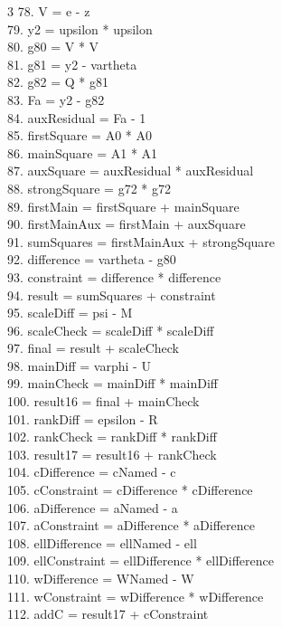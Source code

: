 \documentclass[10pt]{article}
\begin{document}
\begin{multicols}{3}
78. V = e - z\\
79. y2 = upsilon * upsilon\\
80. g80 = V * V\\
81. g81 = y2 - vartheta\\
82. g82 = Q * g81\\
83. Fa = y2 - g82\\
84. auxResidual = Fa - 1\\
85. firstSquare = A0 * A0\\
86. mainSquare = A1 * A1\\
87. auxSquare = auxResidual * auxResidual\\
88. strongSquare = g72 * g72\\
89. firstMain = firstSquare + mainSquare\\
90. firstMainAux = firstMain + auxSquare\\
91. sumSquares = firstMainAux + strongSquare\\
92. difference = vartheta - g80\\
93. constraint = difference * difference\\
94. result = sumSquares + constraint\\
95. scaleDiff = psi - M\\
96. scaleCheck = scaleDiff * scaleDiff\\
97. final = result + scaleCheck\\
98. mainDiff = varphi - U\\
99. mainCheck = mainDiff * mainDiff\\
100. result16 = final + mainCheck\\
101. rankDiff = epsilon - R\\
102. rankCheck = rankDiff * rankDiff\\
103. result17 = result16 + rankCheck\\
104. cDifference = cNamed - c\\
105. cConstraint = cDifference * cDifference\\
106. aDifference = aNamed - a\\
107. aConstraint = aDifference * aDifference\\
108. ellDifference = ellNamed - ell\\
109. ellConstraint = ellDifference * ellDifference\\
110. wDifference = WNamed - W\\
111. wConstraint = wDifference * wDifference\\
112. addC = result17 + cConstraint\\

\end{multicols}
\end{document}
